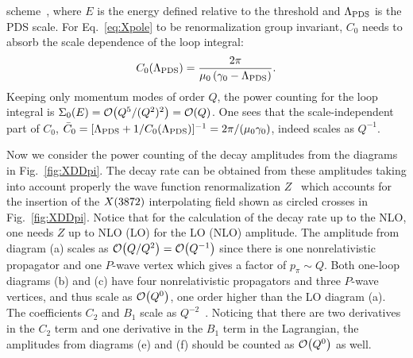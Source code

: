 scheme~\cite{Kaplan:1998tg,Kaplan:1998we}, where $E$ is the energy defined 
relative to the threshold and $\Lambda_{\rm PDS}$ is the PDS scale. 
For Eq.~\eqref{eq:Xpole} to be renormalization 
group invariant, $C_0$ needs to absorb the scale dependence of the loop 
integral:
\begin{equation}
  C_0(\Lambda_{\rm PDS}) = \frac{2\pi}{\mu_0\left(\gamma_0 - \Lambda_{\rm PDS} 
\right) }.
\label{eq:C0PDS}
\end{equation}
Keeping only momentum modes of order $Q$, the power counting for the loop 
integral is  $\Sigma_0(E)=\mathcal{O}\!\left(Q^5/(Q^2)^2\right)\!\,=\mathcal{O}\!\left(Q\right)\!\,$. One sees that 
the scale-independent part of $C_0$, $\bar C_0 = [\Lambda_{\rm PDS} + 
1/C_0( \Lambda_{\rm PDS}) ]^{-1} = 2\pi/(\mu_0\gamma_0)$, indeed scales as 
$Q^{-1}$.

Now we consider the power counting of the decay amplitudes from the 
diagrams 
in Fig.~\ref{fig:XDDpi}. The decay rate can be obtained from these amplitudes 
taking into account properly the wave function renormalization 
$Z$~\cite{Fleming:2007rp} which accounts for the insertion of the $X(3872)$ 
interpolating field shown as circled crosses in Fig.~\ref{fig:XDDpi}. Notice 
that for the calculation of the decay rate up to the NLO, one needs $Z$ up to 
NLO (LO) for the LO (NLO) amplitude. The amplitude from diagram (a) scales as 
$\mathcal{O}\!\left(Q/Q^2\right)\!\,=\mathcal{O}\!\left(Q^{-1}\right)\!\,$ since there is one nonrelativistic propagator 
and one $P$-wave vertex which gives a factor of $p_\pi\sim Q$. Both one-loop 
diagrams (b) and (c) have four nonrelativistic propagators and three $P$-wave 
vertices, and thus scale as $\mathcal{O}\!\left(Q^0\right)\!\,$, one order higher 
than the LO diagram (a). The coefficients $C_2$ and $B_1$ scale as 
$Q^{-2}$~\cite{Fleming:2007rp}. Noticing that there are two derivatives in the 
$C_2$ term and one derivative in the $B_1$ term in the Lagrangian, the 
amplitudes from diagrams (e) and (f) should be counted as $\mathcal{O}\!\left(Q^0\right)\!\,$ as well.

